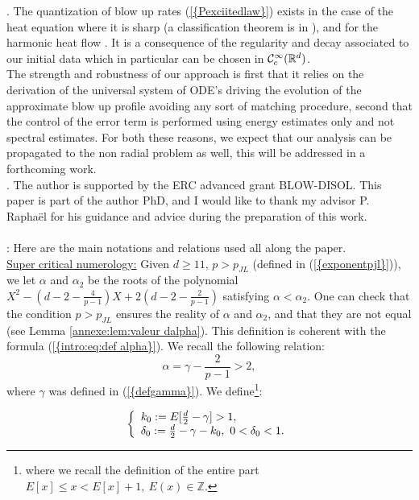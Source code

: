 \documentclass[11pt,a4paper,reqno]{amsart}
\theoremstyle{remark}
\numberwithin{equation}{section}
\begin{document}
. The quantization of blow up rates {{\rm (\ref{{Pexciitedlaw}})}} exists in the case of the heat equation where it is sharp (a classification theorem is in \cite{Mizo2}), and for the harmonic heat flow \cite{RSc2}. It is a consequence of the regularity and decay associated to our initial data which in particular can be chosen in $\mathcal C^{\infty}_{c}(\Bbb R^d)$.\\

The strength and robustness of our approach is first that it relies on the derivation of the universal system of ODE's driving the evolution of the approximate blow up profile avoiding any sort of matching procedure, second that the control of the error term is performed using energy estimates only and not spectral estimates. For both these reasons, we expect that our analysis can be propagated to the non radial problem as well, this will be addressed in a forthcoming work.\\
  
  
 

. The author is supported by the ERC advanced grant BLOW-DISOL. This paper is part of the author PhD, and I would like to thank my advisor P. Rapha\"el for his guidance and advice during the preparation of this work.\\
\\

: Here are the main notations and relations used all along the paper.\\
\underline{Super critical numerology:} Given $d\geq 11$, $p> p_{JL}$ (defined in {{\rm (\ref{{exponentpjl}})}}), we let $\alpha$ and $\alpha_2$ be the roots of the polynomial $X^2-(d-2-\frac{4}{p-1})X+2(d-2-\frac{2}{p-1})$ satisfying $\alpha<\alpha_2$. One can check that the condition $p>p_{JL}$ ensures the reality of $\alpha$ and $\alpha_2$, and that they are not equal (see Lemma \ref{annexe:lem:valeur dalpha}). This definition is coherent with the formula {{\rm (\ref{{intro:eq:def alpha}})}}. We recall the following relation:
$$
\alpha = \gamma -\frac{2}{p-1}>2,
$$
where $\gamma$ was defined in {{\rm (\ref{{defgamma}})}}. We define\footnote{where we recall the definition of the entire part $E[x]\leq x < E[x]+1, \ E(x)\in \mathbb{Z}$.}:

\begin{equation} \label{intro:eq:def k0}
\left\{ \begin{array}{l l} k_0:=E[\frac{d}{2}-\gamma]>1, \\
\delta_0:=\frac{d}{2}-\gamma-k_0, \ 0< \delta_0<1.
\end{array} \right.
\end{equation}
\end{document}
